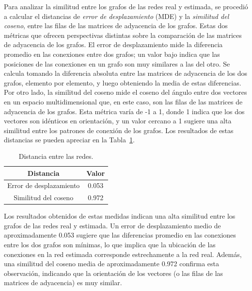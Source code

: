Para analizar la similitud entre los grafos de las redes real y estimada, se procedió a calcular el distancias de \textit{error de desplazamiento} (MDE) y la \textit{similitud del coseno}, entre las filas de las matrices de adyacencia de los grafos. Estas dos métricas que ofrecen perspectivas distintas sobre la comparación de las matrices de adyacencia de los grafos. El error de desplazamiento mide la diferencia promedio en las conexiones entre dos grafos; un valor bajo indica que las posiciones de las conexiones en un grafo son muy similares a las del otro. Se calcula tomando la diferencia absoluta entre las matrices de adyacencia de los dos grafos, elemento por elemento, y luego obteniendo la media de estas diferencias. Por otro lado, la similitud del coseno mide el coseno del ángulo entre dos vectores en un espacio multidimensional que, en este caso, son las filas de las matrices de adyacencia de los grafos. Esta métrica varía de -1 a 1, donde 1 indica que los dos vectores son idénticos en orientación, y un valor cercano a 1 sugiere una alta similitud entre los patrones de conexión de los grafos. Los resultados de estas distancias se pueden apreciar en la Tabla~\ref{tab:metricas_redes_2}.

\begin{table}[H]
    \centering\small
    \begin{tabular}{cc}
    \toprule
          \textbf{Distancia} & \textbf{Valor}  \\
    \midrule
        Error de desplazamiento &  0.053 \\
        Similitud del coseno &  0.972 \\
    \bottomrule
    \end{tabular}
    \caption{Distancia entre las redes.}
    \label{tab:metricas_redes_2}
\end{table}


Los resultados obtenidos de estas medidas indican una alta similitud entre los grafos de las redes real y estimada. Un error de desplazamiento medio de aproximadamente 0.053 sugiere que las diferencias promedio en las conexiones entre los dos grafos son mínimas, lo que implica que la ubicación de las conexiones en la red estimada corresponde estrechamente a la red real. Además, una similitud del coseno media de aproximadamente 0.972 confirma esta observación, indicando que la orientación de los vectores (o las filas de las matrices de adyacencia) es muy similar. 





